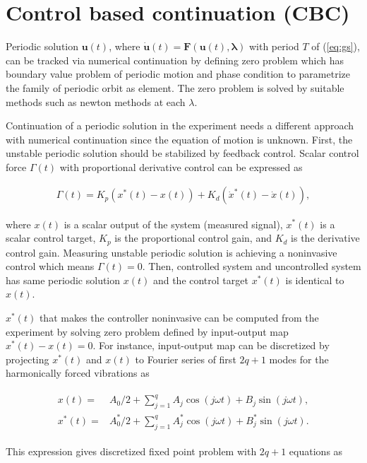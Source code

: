 \documentclass[openacc]{rsproca_new}%
\def\vec#1{\ensuremath{\mathbf{#1}}}
\newcommand{\Eref}[1]{(\ref{#1})}
\begin{document}
\section{Control based continuation (CBC)}\label{CBC}

Periodic solution $\vec{u}(t)$, where $\dot{\vec{u}}(t) =\vec{F}(\vec{u}(t),\vec{\lambda})$ with period $T$ of \Eref{eq:gs}, can be tracked via numerical continuation by defining zero problem which has boundary value problem of periodic motion and phase condition to parametrize the family of periodic orbit as element. The zero problem is solved by suitable methods such as newton methods at each $\lambda$.

Continuation of a periodic solution in the experiment needs a different approach with numerical continuation since the equation of motion is unknown. First, the unstable periodic solution should be stabilized by feedback control. Scalar control force $\Gamma(t)$ with proportional derivative control can be expressed as

\begin{align}
  \Gamma(t)=K_p(x^*(t)-x(t))+K_d(\dot x^*(t)-\dot x(t)),
\end{align}

\noindent where $x(t)$ is a scalar output of the system (measured signal), $x^*(t)$ is a scalar control target, $K_p$ is the proportional control gain, and $K_d$ is the derivative control gain. Measuring unstable periodic solution is achieving a noninvasive control which means $\Gamma(t)=0$. Then, controlled system and uncontrolled system has same periodic solution $x(t)$ and the control target $x^*(t)$ is identical to $x(t)$.

$x^*(t)$ that makes the controller noninvasive can be computed from the experiment by solving zero problem defined by input-output map $x^*(t)-x(t)=0$. For instance, input-output map can be discretized by projecting $x^*(t)$ and $x(t)$ to Fourier series of first $2q+1$ modes for the harmonically forced vibrations as

\begin{align}\label{eq:dis}
  \begin{split}
  x(t)=&A_0/2+  \sum_{j=1}^{q} A_j \cos (j\omega t)+B_j \sin (j\omega t),\\
  x^*(t)=&A_0^*/2+  \sum_{j=1}^{q} A^*_j \cos (j\omega t)+B^*_j \sin (j\omega t).
\end{split}
\end{align}

\noindent This expression gives discretized fixed point problem with $2q+1$ equations as
\end{document}
